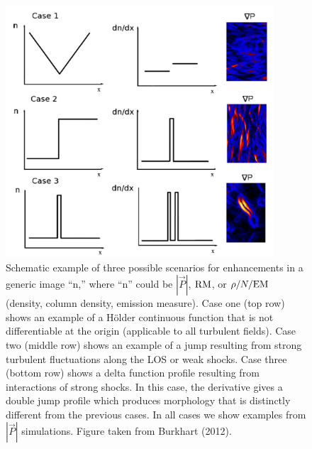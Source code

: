 \documentclass[a4paper,10pt]{article}
\begin{document}
\begin{figure}[h]
\begin{center}
\includegraphics[width=10cm]{figures/PolGradProfiles.png}
\caption{\footnotesize{Schematic example of three possible scenarios for enhancements in a generic image ``n,'' where ``n'' could be $|\vec{P}|$, $\rm RM$, or $\rho/N/{\rm EM}$ (density, column density, emission measure). Case one (top row) shows an example of a H\"older continuous function that is not differentiable at the origin (applicable to all turbulent fields). Case two (middle row) shows an example of a jump resulting from strong turbulent fluctuations along the LOS or weak shocks. Case three (bottom row) shows a delta function profile resulting from interactions of strong shocks. In this case, the derivative gives a double jump profile which produces morphology that is distinctly different from the previous cases. In all cases we show examples from $|\vec{P}|$ simulations. Figure taken from Burkhart (2012).}}
\label{fig:polgradprofiles}
\end{center}
\end{figure}
\end{document}
